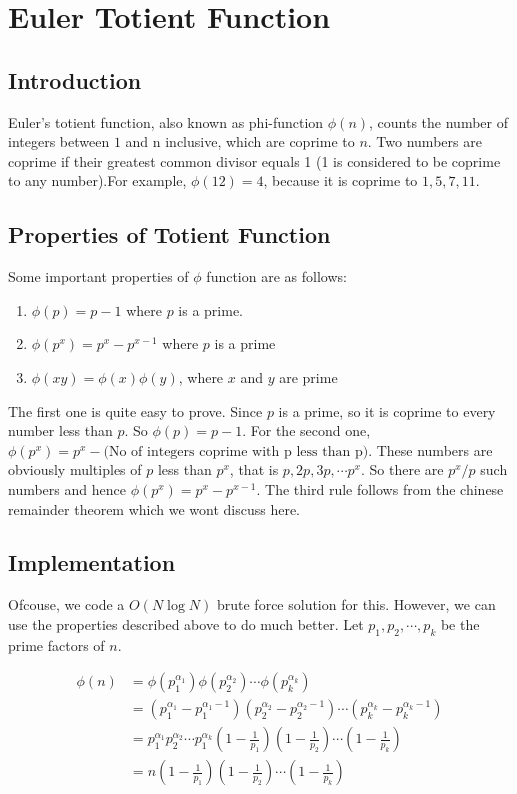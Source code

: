 \chapter{Euler Totient Function}

\section{Introduction}
Euler's totient function, also known as phi-function $\phi(n)$, counts the number of integers between $1$ and n inclusive, which are coprime to $n$. Two numbers are coprime if their greatest common divisor equals 1 (1 is considered to be coprime to any number).For example, $\phi(12) = 4$, because it is coprime to $1,5,7,11$.

\section{Properties of Totient Function}
Some important properties of $\phi$ function are as follows:
\begin{enumerate}
  \item $\phi(p) = p-1$ where $p$ is a prime.
  \item $\phi(p^x) = p^x - p^{x-1}$ where $p$ is a prime
  \item $\phi(xy) = \phi(x)\phi(y)$, where $x$ and $y$ are prime
\end{enumerate} 
The first one is quite easy to prove. Since $p$ is a prime, so it is coprime to every number less than $p$. So $\phi(p) = p-1$. For the second one, $\phi(p^x) = p^x - \text{(No of integers coprime with p less than p)}$. These numbers are obviously multiples of $p$ less than $p^x$, that is $p,2p,3p,\cdots p^x$. So there are $p^x/p$ such numbers and hence $\phi(p^x) = p^x - p^{x-1}$. The third rule follows from the chinese remainder theorem which we wont discuss here.

\clearpage
\section{Implementation}
Ofcouse, we code a $O(N \log N)$ brute force solution for this. However, we can use the properties described above to do much better. Let $p_1, p_2, \cdots , p_k$ be the prime factors of $n$.

\begin{align*}
    \phi(n) &= \phi(p_1 ^ {\alpha_1}) \phi(p_2 ^ {\alpha_2})  \cdots \phi(p_k ^ {\alpha_k})\\
    &=(p_1^{\alpha_1} - p_1^{\alpha_1-1})(p_2^{\alpha_2} - p_2^{\alpha_2-1})\cdots (p_k^{\alpha_k} - p_k^{\alpha_k-1})\\
    &= p_1^{\alpha_1}p_2^{\alpha_2}\cdots p_1^{\alpha_k} \left(1-\frac{1}{p_1}\right)\left(1-\frac{1}{p_2}\right)\cdots\left(1-\frac{1}{p_k}\right)\\
    &= n\left(1-\frac{1}{p_1}\right)\left(1-\frac{1}{p_2}\right)\cdots\left(1-\frac{1}{p_k}\right)
\end{align*}

